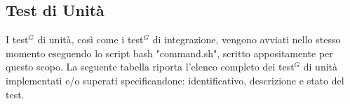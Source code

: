 \subsection{Test di Unità}
I test$^G$ di unità, così come i test$^G$ di integrazione, vengono avviati nello stesso momento eseguendo lo script bash "command.sh", scritto appositamente per questo scopo.
La seguente tabella riporta l'elenco completo dei test$^G$ di unità implementati e/o superati specificandone: identificativo, descrizione e stato del test.



